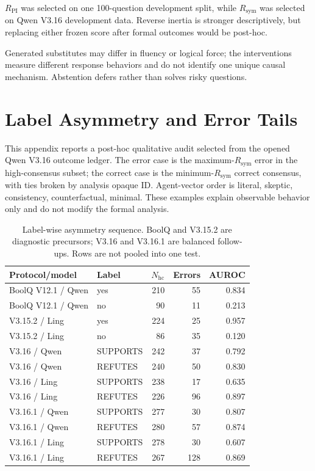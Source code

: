 \documentclass[11pt]{article}
\newcommand{\rpi}{R_{\mathrm{PI}}}
\begin{document}
$\rpi$ was selected on one 100-question development split, while $R_{\mathrm{sym}}$ was selected on Qwen V3.16 development data. Reverse inertia is stronger descriptively, but replacing either frozen score after formal outcomes would be post-hoc.

Generated substitutes may differ in fluency or logical force; the interventions measure different response behaviors and do not identify one unique causal mechanism. Abstention defers rather than solves risky questions.



\appendix

\section{Label Asymmetry and Error Tails}
\label{sec:tail}

This appendix reports a post-hoc qualitative audit selected from the opened Qwen V3.16 outcome ledger. The error case is the maximum-$R_{\mathrm{sym}}$ error in the high-consensus subset; the correct case is the minimum-$R_{\mathrm{sym}}$ correct consensus, with ties broken by analysis opaque ID. Agent-vector order is literal, skeptic, consistency, counterfactual, minimal. These examples explain observable behavior only and do not modify the formal analysis.

\begin{table}[t]
\centering
\scriptsize
\setlength{\tabcolsep}{3pt}
\begin{tabular}{llrrr}
\toprule
Protocol/model & Label & $N_{\mathrm{hc}}$ & Errors & AUROC \\
\midrule
BoolQ V12.1 / Qwen & yes & 210 & 55 & 0.834 \\
BoolQ V12.1 / Qwen & no & 90 & 11 & 0.213 \\
V3.15.2 / Ling & yes & 224 & 25 & 0.957 \\
V3.15.2 / Ling & no & 86 & 35 & 0.120 \\
V3.16 / Qwen & SUPPORTS & 242 & 37 & 0.792 \\
V3.16 / Qwen & REFUTES & 240 & 50 & 0.830 \\
V3.16 / Ling & SUPPORTS & 238 & 17 & 0.635 \\
V3.16 / Ling & REFUTES & 226 & 96 & 0.897 \\
V3.16.1 / Qwen & SUPPORTS & 277 & 30 & 0.807 \\
V3.16.1 / Qwen & REFUTES & 280 & 57 & 0.874 \\
V3.16.1 / Ling & SUPPORTS & 278 & 30 & 0.607 \\
V3.16.1 / Ling & REFUTES & 267 & 128 & 0.869 \\
\bottomrule
\end{tabular}
\caption{Label-wise asymmetry sequence. BoolQ and V3.15.2 are diagnostic precursors; V3.16 and V3.16.1 are balanced follow-ups. Rows are not pooled into one test.}
\label{tab:label-asymmetry}
\end{table}
\end{document}
